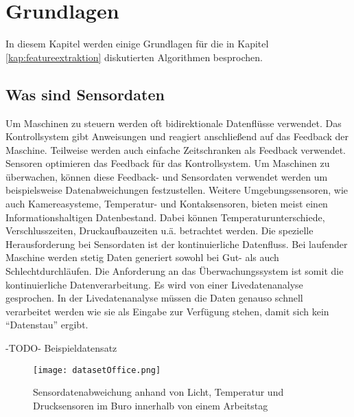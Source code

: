 \section{Grundlagen}\label{kap:grundlagen}
In diesem Kapitel werden einige Grundlagen für die in Kapitel \ref{kap:featureextraktion} diskutierten Algorithmen besprochen.
\subsection{Was sind Sensordaten}\label{kap:sensordaten}
Um Maschinen zu steuern werden oft bidirektionale Datenflüsse verwendet. 
Das Kontrollsystem gibt Anweisungen und reagiert anschließend auf das Feedback der Maschine. 
Teilweise werden auch einfache Zeitschranken als Feedback verwendet. 
Sensoren optimieren das Feedback für das Kontrollsystem. 
Um Maschinen zu überwachen, können diese Feedback- und Sensordaten verwendet werden um beispielsweise Datenabweichungen festzustellen. 
Weitere Umgebungssensoren, wie auch Kamereasysteme, Temperatur- und Kontaksensoren, bieten meist einen Informationshaltigen Datenbestand. 
Dabei können Temperaturunterschiede, Verschlusszeiten, Druckaufbauzeiten u.ä. betrachtet werden. 
Die spezielle Herausforderung bei Sensordaten ist der kontinuierliche Datenfluss. 
Bei laufender Maschine werden stetig Daten generiert sowohl bei Gut- als auch Schlechtdurchläufen. 
Die Anforderung an das Überwachungssystem ist somit die kontinuierliche Datenverarbeitung. 
Es wird von einer Livedatenanalyse gesprochen.
In der Livedatenanalyse müssen die Daten genauso schnell verarbeitet werden wie sie als Eingabe zur Verfügung stehen, damit sich kein \enquote{Datenstau} ergibt. 

\begin{center}
  -TODO- Beispieldatensatz
\end{center}

\begin{figure}
  \centering
  \texttt{[image: datasetOffice.png]}
  \caption{Sensordatenabweichung anhand von Licht, Temperatur und Drucksensoren im Buro innerhalb von einem Arbeitstag~\cite{moraru2010using}}
  \label{fig:datasetoffice}
\end{figure}


